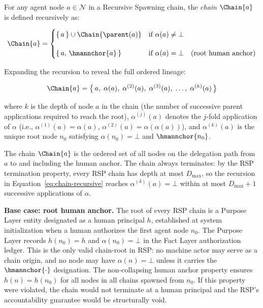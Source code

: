 \begin{definition}
\label{def:chain-operator}
For any agent node $a \in \mathcal{N}$ in a Recursive Spawning chain, the \emph{chain} $\Chain{a}$ is defined recursively as:

\begin{equation}
\Chain{a} =
\begin{cases}
\{\,a\,\} \cup \Chain{\parent(a)} & \text{if } \alpha(a) \neq \bot \\[12pt]
\{\,a,\, \hmannchor{a}\,\} & \text{if } \alpha(a) = \bot \quad \text{(root human anchor)}
\end{cases}
\label{eq:chain-recursive}
\end{equation}

Expanding the recursion to reveal the full ordered lineage:

\begin{equation}
\Chain{a} = \bigl\{\, a,\; \alpha(a),\; \alpha^{(2)}(a),\; \alpha^{(3)}(a),\; \ldots,\; \alpha^{(k)}(a) \,\bigr\}
\label{eq:chain-expanded}
\end{equation}

where $k$ is the depth of node $a$ in the chain (the number of successive parent applications required to reach the root), $\alpha^{(j)}(a)$ denotes the $j$-fold application of $\alpha$ (i.e., $\alpha^{(1)}(a) = \alpha(a)$, $\alpha^{(2)}(a) = \alpha(\alpha(a))$), and $\alpha^{(k)}(a)$ is the unique root node $n_0$ satisfying $\alpha(n_0) = \bot$ and $\hmannchor{n_0}$.
\end{definition}

The chain $\Chain{a}$ is the ordered set of all nodes on the delegation path from $a$ to and including the human anchor. The chain always terminates: by the RSP termination property, every RSP chain has depth at most $D_{\max}$, so the recursion in Equation~\ref{eq:chain-recursive} reaches $\alpha^{(k)}(a) = \bot$ within at most $D_{\max} + 1$ successive applications of $\alpha$.

\bigskip
\noindent\textbf{Base case: root human anchor.} The root of every RSP chain is a Purpose Layer entity designated as a human principal $h$, established at system initialization when a human authorizes the first agent node $n_0$. The Purpose Layer records $h(n_0) = h$ and $\alpha(n_0) = \bot$ in the Fact Layer authorization ledger. This is the only valid chain-root in RSP: no machine actor may serve as a chain origin, and no node may have $\alpha(n) = \bot$ unless it carries the $\hmannchor{\cdot}$ designation. The non-collapsing human anchor property ensures $h(n) = h(n_0)$ for all nodes in all chains spawned from $n_0$. If this property were violated, the chain would not terminate at a human principal and the RSP's accountability guarantee would be structurally void.

